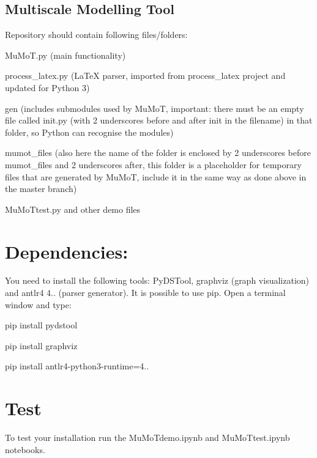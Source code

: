 \subsection*{Multiscale Modelling Tool }

Repository should contain following files/folders\+:
\begin{DoxyItemize}
\item Mu\+Mo\+T.\+py (main functionality)
\item process\+\_\+latex.\+py (La\+TeX parser, imported from process\+\_\+latex project and updated for Python 3)
\item gen (includes submodules used by Mu\+MoT, important\+: there must be an empty file called init.\+py (with 2 underscores before and after init in the filename) in that folder, so Python can recognise the modules)
\item mumot\+\_\+files (also here the name of the folder is enclosed by 2 underscores before mumot\+\_\+files and 2 underscores after, this folder is a placeholder for temporary files that are generated by Mu\+MoT, include it in the same way as done above in the master branch)
\item Mu\+Mo\+Ttest.\+py and other demo files
\end{DoxyItemize}

\section*{Dependencies\+:}

You need to install the following tools\+: Py\+D\+S\+Tool, graphviz (graph visualization) and antlr4 4.. (parser generator). It is possible to use pip. Open a terminal window and type\+:


\begin{DoxyItemize}
\item pip install pydstool
\item pip install graphviz
\item pip install antlr4-\/python3-\/runtime=4..
\end{DoxyItemize}

\section*{Test}

To test your installation run the \textquotesingle{}Mu\+Mo\+Tdemo.\+ipynb\textquotesingle{} and \textquotesingle{}Mu\+Mo\+Ttest.\+ipynb\textquotesingle{} notebooks. 
